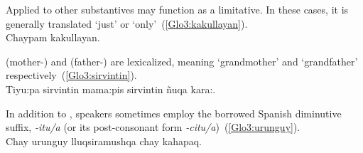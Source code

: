 \noindent
Applied to other substantives  may function as a limitative. In these cases, it is generally translated ‘just’ or ‘only’~(\ref{Glo3:kakullayan}).\\

%
{Chaypam kakullayan.}%
{}%
{}{}%

\noindent
{} (mother-) and  (father-) are lexicalized, meaning ‘grandmother’ and ‘grandfather’ respectively~(\ref{Glo3:sirvintin}).\\

%
{Tiyu:pa sirvintin mama:pis sirvintin ñuqa kara:.}%
{}%
{}{}%

\noindent
In addition to , speakers sometimes employ the borrowed Spanish diminutive suffix, \emph{-itu/a} (or its post-consonant form \emph{-citu/a})~(\ref{Glo3:urunguy}).\\

%
{Chay urunguy lluqsiramushqa chay kahapaq.}%
{}%
{}{}%
